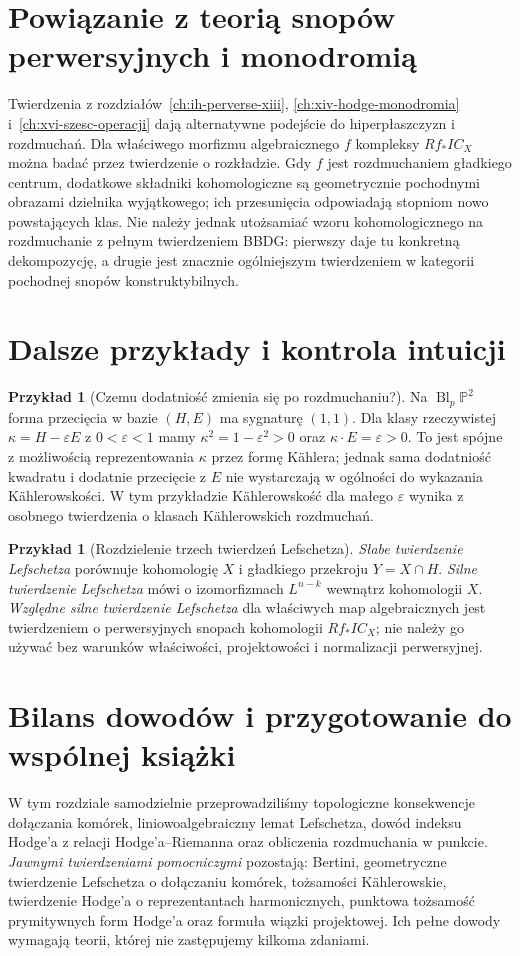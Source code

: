 \documentclass[11pt,a4paper,oneside]{report}
\theoremstyle{plain}
\theoremstyle{definition}
\newtheorem{przyklad}[twierdzenie]{Przykład}
\theoremstyle{remark}
\begin{document}
\section{Powiązanie z teorią snopów perwersyjnych i monodromią}
Twierdzenia z rozdziałów~\ref{ch:ih-perverse-xiii},
\ref{ch:xiv-hodge-monodromia} i~\ref{ch:xvi-szesc-operacji}
dają alternatywne podejście do hiperpłaszczyzn i rozdmuchań.
Dla właściwego morfizmu algebraicznego $f$ kompleksy $Rf_*IC_X$
można badać przez twierdzenie o rozkładzie.
Gdy $f$ jest rozdmuchaniem gładkiego centrum,
dodatkowe składniki kohomologiczne są geometrycznie
pochodnymi obrazami dzielnika wyjątkowego; ich przesunięcia
odpowiadają stopniom nowo powstających klas.
Nie należy jednak utożsamiać wzoru kohomologicznego
na rozdmuchanie z pełnym twierdzeniem BBDG:
pierwszy daje tu konkretną dekompozycję,
a drugie jest znacznie ogólniejszym twierdzeniem
w kategorii pochodnej snopów konstruktybilnych.

\section{Dalsze przykłady i kontrola intuicji}
\begin{przyklad}[Czemu dodatniość zmienia się po rozdmuchaniu?]
Na $\operatorname{Bl}_p\mathbb P^2$ forma przecięcia w bazie
$(H,E)$ ma sygnaturę $(1,1)$. Dla klasy rzeczywistej
$\kappa=H-\varepsilon E$ z $0<\varepsilon<1$ mamy
$\kappa^2=1-\varepsilon^2>0$ oraz
$\kappa\cdot E=\varepsilon>0$.
To jest spójne z możliwością reprezentowania $\kappa$
przez formę Kählera; jednak sama dodatniość kwadratu
i dodatnie przecięcie z $E$ nie wystarczają w ogólności
do wykazania Kählerowskości. W tym przykładzie
Kählerowskość dla małego $\varepsilon$ wynika z osobnego
twierdzenia o klasach Kählerowskich rozdmuchań.
\end{przyklad}
\begin{przyklad}[Rozdzielenie trzech twierdzeń Lefschetza]
\emph{Słabe twierdzenie Lefschetza} porównuje kohomologię $X$ i gładkiego
przekroju $Y=X\cap H$. \emph{Silne twierdzenie Lefschetza} mówi o
izomorfizmach $L^{n-k}$ wewnątrz kohomologii $X$.
\emph{Względne silne twierdzenie Lefschetza} dla właściwych map algebraicznych
jest twierdzeniem o perwersyjnych snopach kohomologii
$Rf_*IC_X$; nie należy go używać bez warunków
właściwości, projektowości i normalizacji perwersyjnej.
\end{przyklad}

\section{Bilans dowodów i przygotowanie do wspólnej książki}
W tym rozdziale samodzielnie przeprowadziliśmy topologiczne
konsekwencje dołączania komórek, liniowoalgebraiczny lemat
Lefschetza, dowód indeksu Hodge'a z relacji
Hodge'a--Riemanna oraz obliczenia rozdmuchania w punkcie.
\emph{Jawnymi twierdzeniami pomocniczymi} pozostają:
Bertini, geometryczne twierdzenie Lefschetza o dołączaniu
komórek, tożsamości Kählerowskie, twierdzenie Hodge'a
o reprezentantach harmonicznych, punktowa tożsamość
prymitywnych form Hodge'a oraz formuła wiązki projektowej.
Ich pełne dowody wymagają teorii, której nie zastępujemy
kilkoma zdaniami.
\end{document}
